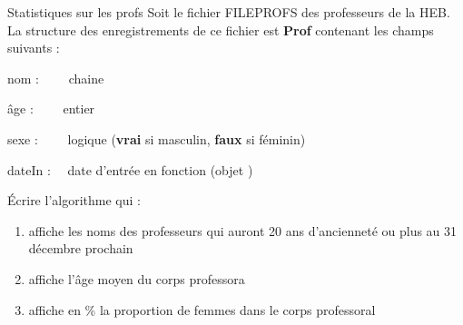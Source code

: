 \begin{Exercice}{Statistiques sur les profs}
	Soit le fichier FILEPROFS des professeurs de la
	HEB. La structure des enregistrements de ce fichier est
	{\textbf{Prof}}	contenant les champs suivants :

	{	nom : \ \ \ \ chaine}

	{	âge : \ \ \ \ entier}

	{	sexe : \ \ \ \ logique	
	(\textbf{vrai} si	masculin,	\textbf{faux} si féminin)}

	{	dateIn : \ \ date d’entrée en fonction 
	(objet )}

	
	Écrire l’algorithme qui :
	
	\begin{enumerate}[label=\alph*)]
		\item 
			affiche les noms des professeurs qui auront 20 ans d’ancienneté ou plus
			au 31 décembre prochain
		\item 
			affiche l’âge moyen du corps professora
		\item 
			affiche en \% la proportion de femmes dans le corps professoral
	\end{enumerate}
\end{Exercice}

